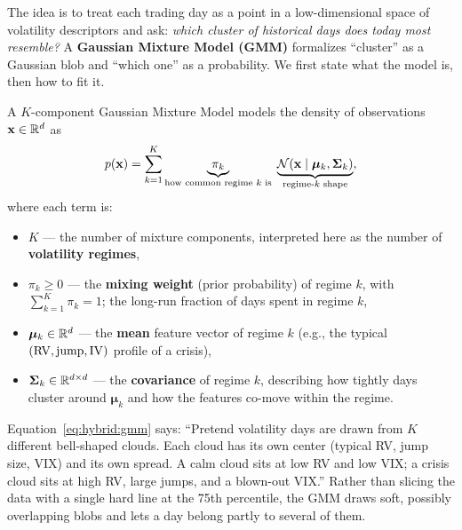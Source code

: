 The idea is to treat each trading day as a point in a low-dimensional
space of volatility descriptors and ask: \emph{which cluster of historical
days does today most resemble?}  A \textbf{Gaussian Mixture Model (GMM)}
formalizes ``cluster'' as a Gaussian blob and ``which one'' as a
probability.  We first state what the model is, then how to fit it.

\begin{definition}
A $K$-component Gaussian Mixture Model models the density of observations
$\mathbf{x} \in \mathbb{R}^d$ as
\begin{equation}\label{eq:hybrid:gmm}
  p(\mathbf{x}) = \sum_{k=1}^{K}
    \underbrace{\pi_k}_{\text{how common regime }k\text{ is}}\;
    \underbrace{\mathcal{N}(\mathbf{x} \mid \bm{\mu}_k, \bm{\Sigma}_k)}_{\text{regime-}k\text{ shape}},
\end{equation}
where each term is:
\begin{itemize}
  \item $K$ --- the number of mixture components, interpreted here as the
        number of \textbf{volatility regimes},
  \item $\pi_k \geq 0$ --- the \textbf{mixing weight} (prior probability)
        of regime $k$, with $\sum_{k=1}^K \pi_k = 1$; the long-run
        fraction of days spent in regime $k$,
  \item $\bm{\mu}_k \in \mathbb{R}^d$ --- the \textbf{mean} feature vector of
        regime $k$ (e.g., the typical $(\operatorname{RV}, \text{jump}, \operatorname{IV})$ profile
        of a crisis),
  \item $\bm{\Sigma}_k \in \mathbb{R}^{d \times d}$ --- the \textbf{covariance}
        of regime $k$, describing how tightly days cluster around
        $\bm{\mu}_k$ and how the features co-move within the regime.
\end{itemize}

\begin{intuition}
Equation~\eqref{eq:hybrid:gmm} says: ``Pretend volatility days are drawn
from $K$ different bell-shaped clouds.  Each cloud has its own center
(typical RV, jump size, VIX) and its own spread.  A calm cloud sits at low
RV and low VIX; a crisis cloud sits at high RV, large jumps, and a
blown-out VIX.''  Rather than slicing the data with a single hard line at
the 75th percentile, the GMM draws soft, possibly overlapping blobs and
lets a day belong partly to several of them.
\end{intuition}


\end{definition}
